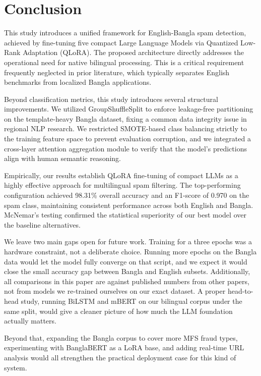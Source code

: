 \documentclass[journal]{IEEEtran}
\begin{document}
\balance
\section{Conclusion}

This study introduces a unified framework for English-Bangla spam detection, achieved by fine-tuning five compact Large Language Models via Quantized Low-Rank Adaptation (QLoRA). The proposed architecture directly addresses the operational need for native bilingual processing. This is a critical requirement frequently neglected in prior literature, which typically separates English benchmarks from localized Bangla applications.

Beyond classification metrics, this study introduces several structural improvements. We utilized GroupShuffleSplit to enforce leakage-free partitioning on the template-heavy Bangla dataset, fixing a common data integrity issue in regional NLP research. We restricted SMOTE-based class balancing strictly to the training feature space to prevent evaluation corruption, and we integrated a cross-layer attention aggregation module to verify that the model's predictions align with human semantic reasoning.

Empirically, our results establish QLoRA fine-tuning of compact LLMs as a highly effective approach for multilingual spam filtering. The top-performing configuration achieved 98.31\% overall accuracy and an F1-score of 0.970 on the spam class, maintaining consistent performance across both English and Bangla. McNemar's testing confirmed the statistical superiority of our best model over the baseline alternatives.

We leave two main gaps open for future work. Training for a three epochs was a hardware constraint, not a deliberate choice. Running more epochs on the Bangla data would let the model fully converge on that script, and we expect it would close the small accuracy gap between Bangla and English subsets. Additionally, all comparisons in this paper are against published numbers from other papers, not from models we re-trained ourselves on our exact dataset. A proper head-to-head study, running BiLSTM and mBERT on our bilingual corpus under the same split, would give a cleaner picture of how much the LLM foundation actually matters.

Beyond that, expanding the Bangla corpus to cover more MFS fraud types, experimenting with BanglaBERT as a LoRA base, and adding real-time URL analysis would all strengthen the practical deployment case for this kind of system.



\end{document}

